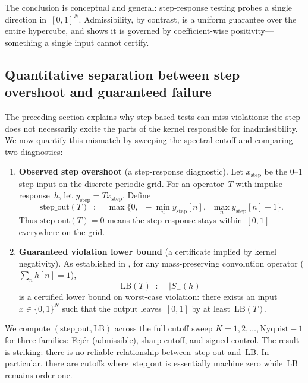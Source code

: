 \documentclass[11pt,a4paper]{article}
\theoremstyle{plain}
\theoremstyle{definition}
\theoremstyle{plain}
\newcommand{\Sminus}{S_{-}}
\newcommand{\stepout}{\mathrm{step\_out}}
\begin{document}
The conclusion is conceptual and general: step-response testing probes a single
direction in~$[0,1]^N$.  Admissibility, by contrast, is a uniform guarantee over
the entire hypercube, and  shows it is governed by
coefficient-wise positivity---something a single input cannot certify.


\subsection{Quantitative separation between step overshoot and guaranteed failure}
\label{sec:quantitative}

The preceding section explains why step-based tests can miss violations: the step
does not necessarily excite the parts of the kernel responsible for
inadmissibility.  We now quantify this mismatch by sweeping the spectral cutoff
and comparing two diagnostics:

\begin{enumerate}[label=\arabic*.,leftmargin=2em]
  \item \textbf{Observed step overshoot} (a step-response diagnostic).
    Let $x_{\mathrm{step}}$ be the $0$--$1$ step input on the discrete periodic
    grid.  For an operator~$T$ with impulse response~$h$, let
    $y_{\mathrm{step}} = T x_{\mathrm{step}}$.  Define
    \[
      \stepout(T)
      \;:=\;
      \max\bigl\{0,\;\;-\!\min_n y_{\mathrm{step}}[n],\;\;
        \max_n y_{\mathrm{step}}[n] - 1\bigr\}.
    \]
    Thus $\stepout(T) = 0$ means the step response stays within~$[0,1]$
    everywhere on the grid.

  \item \textbf{Guaranteed violation lower bound} (a certificate implied by
    kernel negativity).  As established in , for any
    mass-preserving convolution operator ($\sum_n h[n] = 1$),
    \[
      \mathrm{LB}(T) \;:=\; |\Sminus(h)|
    \]
    is a certified lower bound on worst-case violation: there exists an input
    $x \in \{0,1\}^N$ such that the output leaves~$[0,1]$ by at
    least~$\mathrm{LB}(T)$.
\end{enumerate}

We compute $(\stepout, \mathrm{LB})$ across the full cutoff sweep
$K = 1, 2, \dots, \mathrm{Nyquist}-1$ for three families: Fej\'er (admissible),
sharp cutoff, and signed control.  The result is striking: there is no reliable
relationship between~$\stepout$ and~$\mathrm{LB}$.  In particular, there are
cutoffs where~$\stepout$ is essentially machine zero
while~$\mathrm{LB}$ remains order-one.
\end{document}
